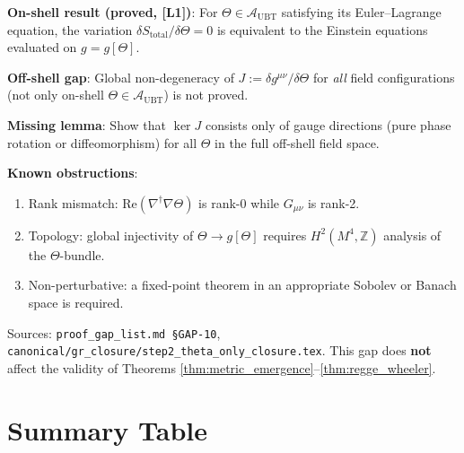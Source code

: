 \documentclass[12pt,a4paper]{article}
\theoremstyle{definition}
\theoremstyle{remark}
\newcommand{\Lone}{\textbf{[L1]}}
\newcommand{\Ltwo}{\textbf{[L2]}}
\newcommand{\OPEN}{\textbf{[OPEN]}}
\newcommand{\AUBT}{\mathcal{A}_{\mathrm{UBT}}}  %
\newcommand{\Stot}{S_{\mathrm{total}}}     %
\begin{document}
\begin{tcolorbox}[colback=red!5!white,colframe=red!60!black,
  title=Open problem GAP-10: Off-shell $\Theta$-only closure \OPEN~\Ltwo]

\textbf{On-shell result (proved, \Lone)}: For $\Theta \in \AUBT$ satisfying its
Euler--Lagrange equation, the variation $\delta\Stot/\delta\Theta = 0$ is
equivalent to the Einstein equations evaluated on $g = g[\Theta]$.

\medskip
\textbf{Off-shell gap}: Global non-degeneracy of $J := \delta g^{\mu\nu}/\delta\Theta$
for \emph{all} field configurations (not only on-shell $\Theta \in \AUBT$) is
not proved.

\medskip
\textbf{Missing lemma}: Show that $\ker J$ consists only of gauge directions
(pure phase rotation or diffeomorphism) for all $\Theta$ in the full off-shell
field space.

\medskip
\textbf{Known obstructions}:
\begin{enumerate}
  \item Rank mismatch: $\mathrm{Re}(\nabla^\dagger\nabla\Theta)$ is rank-0 while
        $G_{\mu\nu}$ is rank-2.
  \item Topology: global injectivity of $\Theta\to g[\Theta]$ requires
        $H^2(M^4,\mathbb{Z})$ analysis of the $\Theta$-bundle.
  \item Non-perturbative: a fixed-point theorem in an appropriate Sobolev
        or Banach space is required.
\end{enumerate}

Sources: \texttt{proof\_gap\_list.md~\S GAP-10},
\texttt{canonical/gr\_closure/step2\_theta\_only\_closure.tex}.
This gap does \textbf{not} affect the validity of Theorems
\ref{thm:metric_emergence}--\ref{thm:regge_wheeler}.
\end{tcolorbox}

\section{Summary Table}
\label{sec:summary}
\end{document}
